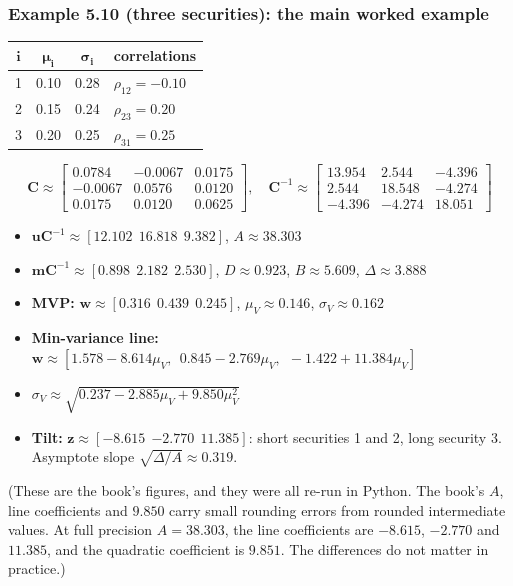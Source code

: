 \documentclass[titlepage,11pt,a4paper]{article}
\newcommand{\vw}{\boldsymbol{w}}
\newcommand{\vm}{\boldsymbol{m}}
\newcommand{\vu}{\boldsymbol{u}}
\newcommand{\vC}{\boldsymbol{C}}
\newcommand{\Ci}{\vC^{-1}}
\begin{document}
\subsubsection{Example 5.10 (three securities): the main worked example}

\begin{center}\renewcommand{\arraystretch}{1.25}
\begin{tabular}{cccl}
\toprule
$\boldsymbol i$ & $\boldsymbol{\mu_i}$ & $\boldsymbol{\sigma_i}$ & \textbf{\color{mycyan}correlations}\\
\midrule
1 & 0.10 & 0.28 & $\rho_{12}=-0.10$\\
2 & 0.15 & 0.24 & $\rho_{23}=0.20$\\
3 & 0.20 & 0.25 & $\rho_{31}=0.25$\\
\bottomrule
\end{tabular}
\end{center}

{\small
\[\vC\approx\begin{bmatrix}0.0784&-0.0067&0.0175\\-0.0067&0.0576&0.0120\\0.0175&0.0120&0.0625\end{bmatrix},\quad \Ci\approx\begin{bmatrix}13.954&2.544&-4.396\\2.544&18.548&-4.274\\-4.396&-4.274&18.051\end{bmatrix}\]}

\begin{itemize}
  \item $\vu\Ci\approx[12.102\ \ 16.818\ \ 9.382]$, $A\approx38.303$
  \item $\vm\Ci\approx[0.898\ \ 2.182\ \ 2.530]$, $D\approx0.923$, $B\approx5.609$, $\Delta\approx3.888$
  \item \textbf{MVP:} $\vw\approx[0.316\ \ 0.439\ \ 0.245]$, $\mu_V\approx0.146$, $\sigma_V\approx0.162$
  \item \textbf{Min-variance line:} $\vw\approx[1.578-8.614\mu_V,\ \ 0.845-2.769\mu_V,\ \ -1.422+11.384\mu_V]$
  \item $\sigma_V\approx\sqrt{0.237-2.885\mu_V+9.850\mu_V^2}$
  \item \textbf{Tilt:} $\boldsymbol z\approx[-8.615\ \ {-2.770}\ \ 11.385]$: short securities 1 and 2, long security 3. Asymptote slope $\sqrt{\Delta/A}\approx0.319$.
\end{itemize}

(These are the book's figures, and they were all re-run in Python. The book's $A$, line coefficients and $9.850$ carry small rounding errors from rounded intermediate values. At full precision $A=38.303$, the line coefficients are $-8.615$, $-2.770$ and $11.385$, and the quadratic coefficient is $9.851$. The differences do not matter in practice.)
\end{document}
